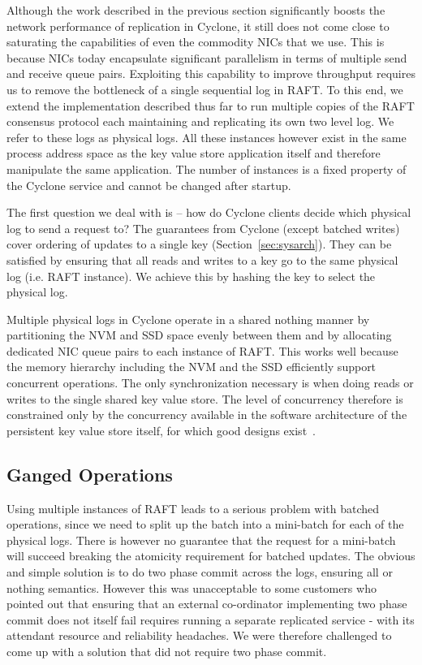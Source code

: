 \documentclass[twocolumn]{article}
\begin{document}
Although the work described in the previous section significantly boosts the
network performance of replication in Cyclone, it still does not come close to
saturating the capabilities of even the commodity NICs that we use. This is
because NICs today encapsulate significant parallelism in terms of
multiple send and receive queue pairs. Exploiting this capability to improve
throughput requires us to remove the bottleneck of a single sequential log in
RAFT. To this end, we extend the implementation described thus far to run
multiple copies of the RAFT consensus protocol each maintaining and replicating
its own two level log. We refer to these logs as physical logs. All these
instances however exist in the same process address space as the key value store
application itself and therefore manipulate the same application. The number of 
instances is a fixed property of the Cyclone service and cannot be changed after 
startup.

The first question we deal with is -- how do Cyclone clients decide which
physical log to send a request to? The guarantees from Cyclone (except batched
writes)  cover ordering of updates to a single key (Section~\ref{sec:sysarch}). They can 
be satisfied by ensuring that all reads and writes to a key go to the same physical log
(i.e. RAFT instance). We achieve this by hashing the key to select the physical
log.

Multiple physical logs in Cyclone operate in a shared nothing manner by
partitioning the NVM and SSD space evenly between them and by allocating
dedicated NIC queue pairs to each instance of RAFT. This works well because the
memory hierarchy including the NVM and the SSD efficiently support concurrent
operations. The only synchronization necessary is when doing reads or writes to
the single shared key value store.  The level of concurrency therefore is
constrained only by the concurrency available in the software architecture of
the persistent key value store itself, for which good designs
exist~\cite{flodb}.

\subsection{Ganged Operations}
Using multiple instances of RAFT leads to a serious problem with batched operations, 
since we need to split up the batch into a mini-batch for each of the physical logs. There
is however no guarantee that the request for a mini-batch will succeed breaking the atomicity
requirement for batched updates. The obvious and simple solution is to do two phase commit across
the logs, ensuring all or nothing semantics. However this was unacceptable to some customers who
pointed out that ensuring that an external co-ordinator implementing two phase commit does not itself
fail requires running a separate replicated service - with its attendant resource and reliability headaches.
We were therefore challenged to come up with a solution that did not require two phase commit.
\end{document}
